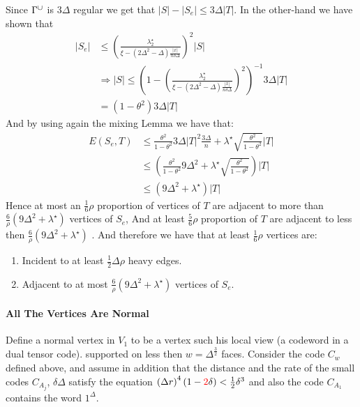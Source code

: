 \documentclass{article}
\begin{document}
\begin{multicols*}{2}
 Since $\Gamma^{\cup}$ is $3\Delta$ regular we get that $|S| - |S_{e}| \le 3\Delta |T| $. In the other-hand we have shown that 
 \begin{equation*}
   \begin{split}
     |S_{e}| & \le \left(\frac{\lambda^{\star}_{2}}{\xi - \left(2\Delta^{2} - \Delta  \right)\frac{|x|}{n \delta\Delta}}\right)^{2}|S| \\ &
     \Rightarrow |S| \le \left( 1 - \left(\frac{\lambda^{\star}_{2}}{\xi - \left(2\Delta^{2} - \Delta  \right)\frac{|x|}{n \delta\Delta}}\right)^{2}\right)^{-1}3\Delta|T| \\
     & = \left( 1 - \theta^2 \right) 3 \Delta |T|
   \end{split}
 \end{equation*}
 And by using again the mixing Lemma we have that: 
 \begin{equation*}
   \begin{split}
     E\left( S_{e},T \right) &\le \frac{\theta^2}{1- \theta^2}3\Delta|T|^2 \frac{3\Delta}{n} + \lambda^{\star}\sqrt{\frac{\theta^2}{1- \theta^2}}|T| \\ 
     & \le  \left( \frac{\theta^2}{1- \theta^2}9\Delta^{2} + \lambda^{\star}\sqrt{\frac{\theta^2}{1- \theta^2}}\right)|T| \\ 
     & \le \left(9\Delta^{2} + \lambda^{\star} \right) |T|
  \end{split}
 \end{equation*}
 Hence at most an $\frac{1}{6}\rho $ proportion of vertices of $T$ are adjacent to more than $\frac{6}{\rho} \left( 9\Delta^{2} + \lambda^{\star}  \right) $ vertices of $S_{e}$, And at least $\frac{5}{6}\rho$ proportion of $T$ are adjacent to less then $\frac{6}{\rho} \left( 9\Delta^{2} + \lambda^{\star}  \right) $ . 
 And therefore we have that at least $\frac{1}{6}\rho$ vertices are:
 \begin{enumerate}
   \item Incident to at least $\frac{1}{2}\Delta\rho$ heavy edges. 
   \item Adjacent to at most $ \frac{6}{\rho} \left( 9\Delta^{2} + \lambda^{\star}  \right)$ vertices of $S_{e}$.  
 \end{enumerate}
	\paragraph{All The Vertices Are Normal} Define a normal vertex in $ V_{1} $ to be a vertex such his local view (a codeword in a dual tensor code). 
	supported on less then $w = \Delta^\frac{3}{2}$ faces.
	Consider the code $C_{w}$ defined above, and assume in addition that the distance and the rate of 
	the small codes $C_{A_{j}}$, $\delta \Delta$ satisfy the equation $ \left(\Delta r\right)^{4}\left(1 - \color{red}2\color{black}\delta\right) < \frac{1}{2}\delta^{3} $ and also the code $ C_{A_{1}}  $ 
      contains the word $ 1^{\Delta} $.



\end{multicols*}
\end{document}
